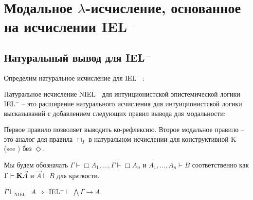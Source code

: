 \section{Модальное $\lambda$-исчисление, основанное на исчислении IEL$^{-}$}

\subsection{Натуральный вывод для IEL$^{-}$}
Определим натуральное исчисление для IEL$^{-}$ :

\begin{defin} Hатуральное исчисление NIEL$^{-}$ для интуиционистской эпистемической логики IEL$^{-}$ -- это
расширение натурального исчисления для интуиционистской логики высказываний с добавлением следующих правил вывода для модальности:

\begin{minipage}{0.5\textwidth}
  \begin{flushleft}
  \begin{prooftree}
\end{prooftree}
  \end{flushleft}
\end{minipage}
\begin{minipage}{0.5\textwidth}
  \begin{flushright}
  \begin{prooftree}
  \end{prooftree}
  \end{flushright}
\end{minipage}
\end{defin}

Первое правило позволяет выводить ко-рефлексию. Второе модальное правило -- это аналог для правила $\Box_I$
в натуральном исчислении для конструктивной K (see \cite{ModalLa}) без $\Diamond$.

Мы будем обозначать $\Gamma \vdash \Box A_1, \dots, \Gamma \vdash \Box A_n$ и $A_1,\dots,A_n \vdash B$ соответственно как $\Gamma \vdash {\bf K} \vec{A}$ и $\vec{A} \vdash B$ для краткости.

\vspace{\baselineskip}

\begin{lemma}
  $\Gamma \vdash_{\text{NIEL}^{-}} A \Rightarrow$ IEL$^{-} \vdash \bigwedge \Gamma \rightarrow A$.
\end{lemma}

